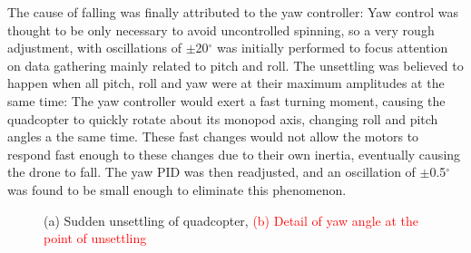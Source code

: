 \documentclass[12pt,a4paper]{article}
\begin{document}
The cause of falling was finally attributed to the yaw controller: Yaw control was thought to be only necessary to avoid uncontrolled spinning, so a very rough adjustment, with oscillations of $\pm$20$^{\circ}$ was initially performed to focus attention on data gathering mainly related to pitch and roll. The unsettling was believed to happen when all pitch, roll and yaw were at their maximum amplitudes at the same time: The yaw controller would exert a fast turning moment, causing the quadcopter to quickly rotate about its monopod axis, changing roll and pitch angles a the same time. These fast changes would not allow the motors to respond fast enough to these changes due to their own inertia, eventually causing the drone to fall. The yaw PID was then readjusted, and an oscillation of $\pm$0.5$^{\circ}$ was found to be small enough to eliminate this phenomenon.


\begin{figure}[h!]
\centering
  \caption{(a) Sudden unsettling of quadcopter, \textcolor{red}{(b) Detail of yaw angle at the point of unsettling }}
  \label{fig9}
\end{figure}
\end{document}

